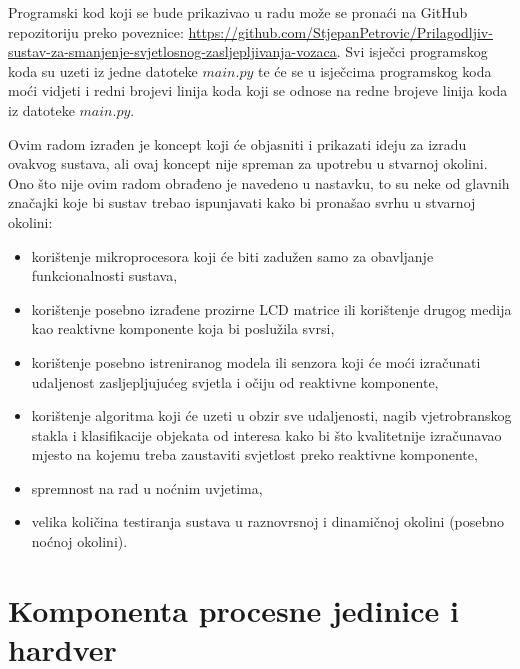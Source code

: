 \documentclass{foi}
\begin{document}
Programski kod koji se bude prikazivao u radu može se pronaći na GitHub repozitoriju preko poveznice: \href{https://github.com/StjepanPetrovic/Prilagodljiv-sustav-za-smanjenje-svjetlosnog-zasljepljivanja-vozaca}{https://github.com/StjepanPetrovic/Prilagodljiv-sustav-za-smanjenje-svjetlosnog-zasljepljivanja-vozaca}. Svi isječci programskog koda su uzeti iz jedne datoteke \href{https://github.com/StjepanPetrovic/Prilagodljiv-sustav-za-smanjenje-svjetlosnog-zasljepljivanja-vozaca/blob/main/development/main.py}{$main.py$} te će se u isječcima programskog koda moći vidjeti i redni brojevi linija koda koji se odnose na redne brojeve linija koda iz datoteke \href{https://github.com/StjepanPetrovic/Prilagodljiv-sustav-za-smanjenje-svjetlosnog-zasljepljivanja-vozaca/blob/main/development/main.py}{$main.py$}.

Ovim radom izrađen je koncept koji će objasniti i prikazati ideju za izradu ovakvog sustava, ali ovaj koncept nije spreman za upotrebu u stvarnoj okolini. Ono što nije ovim radom obrađeno je navedeno u nastavku, to su neke od glavnih značajki koje bi sustav trebao ispunjavati kako bi pronašao svrhu u stvarnoj okolini:
\begin{itemize}[noitemsep]
    \item korištenje mikroprocesora koji će biti zadužen samo za obavljanje funkcionalnosti sustava,
    \item korištenje posebno izrađene prozirne LCD matrice ili korištenje drugog medija kao reaktivne komponente koja bi poslužila svrsi,
    \item korištenje posebno istreniranog modela ili senzora koji će moći izračunati udaljenost zasljepljujućeg svjetla i očiju od reaktivne komponente,
    \item korištenje algoritma koji će uzeti u obzir sve udaljenosti, nagib vjetrobranskog stakla i klasifikacije objekata od interesa kako bi što kvalitetnije izračunavao mjesto na kojemu treba zaustaviti svjetlost preko reaktivne komponente,
    \item spremnost na rad u noćnim uvjetima,
    \item velika količina testiranja sustava u raznovrsnoj i dinamičnoj okolini (posebno noćnoj okolini).
\end{itemize}

\pagebreak
\section{Komponenta procesne jedinice i hardver}
\end{document}
